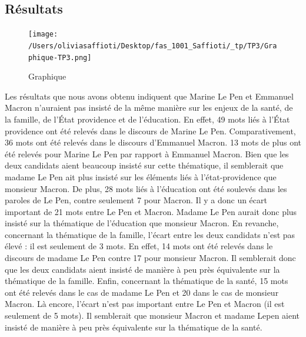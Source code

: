 \documentclass[
  letterpaper,
  DIV=11,
  numbers=noendperiod]{scrartcl}
\begin{document}
\hypertarget{ruxe9sultats}{%
\subsection{Résultats}\label{ruxe9sultats}}

\begin{figure}

{\centering \texttt{[image: /Users/oliviasaffioti/Desktop/fas\_1001\_Saffioti/\_tp/TP3/Graphique-TP3.png]}

}

\caption{Graphique}

\end{figure}

Les résultats que nous avons obtenu indiquent que Marine Le Pen et
Emmanuel Macron n'auraient pas insisté de la même manière sur les enjeux
de la santé, de la famille, de l'État providence et de l'éducation. En
effet, 49 mots liés à l'État providence ont été relevés dans le discours
de Marine Le Pen. Comparativement, 36 mots ont été relevés dans le
discours d'Emmanuel Macron. 13 mots de plus ont été relevés pour Marine
Le Pen par rapport à Emmanuel Macron. Bien que les deux candidats aient
beaucoup insisté sur cette thématique, il semblerait que madame Le Pen
ait plus insisté sur les éléments liés à l'état-providence que monsieur
Macron. De plus, 28 mots liés à l'éducation ont été soulevés dans les
paroles de Le Pen, contre seulement 7 pour Macron. Il y a donc un écart
important de 21 mots entre Le Pen et Macron. Madame Le Pen aurait donc
plus insisté sur la thématique de l'éducation que monsieur Macron. En
revanche, concernant la thématique de la famille, l'écart entre les deux
candidats n'est pas élevé : il est seulement de 3 mots. En effet, 14
mots ont été relevés dans le discours de madame Le Pen contre 17 pour
monsieur Macron. Il semblerait donc que les deux candidats aient insisté
de manière à peu près équivalente sur la thématique de la famille.
Enfin, concernant la thématique de la santé, 15 mots ont été relevés
dans le cas de madame Le Pen et 20 dans le cas de monsieur Macron. Là
encore, l'écart n'est pas important entre Le Pen et Macron (il est
seulement de 5 mots). Il semblerait que monsieur Macron et madame Lepen
aient insisté de manière à peu près équivalente sur la thématique de la
santé.
\end{document}
